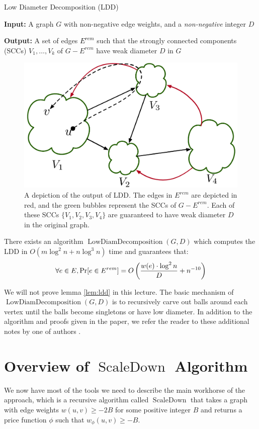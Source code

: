 \documentclass[11pt]{article}
\newcommand{\ScaleDown}{\operatorname{ScaleDown}}
\newcommand{\SCCDecomposition}{\operatorname{LowDiamDecomposition}}
\newcommand{\LowDiamDecomposition}{\SCCDecomposition}
\newcommand{\esep}{E^{rem}}
\newenvironment{tight_itemize}{
\begin{itemize}
 \setlength{\itemsep}{2pt}
 \setlength{\parskip}{1pt}
}{\end{itemize}}
\begin{document}
\begin{definition}{Low Diameter Decomposition (LDD)}
         \begin{tight_itemize}
             \item \textbf{Input:} A graph $G$ with non-negative edge weights, and a \emph{non-negative} integer $D$
             \item \textbf{Output:} A set of edges \textcolor{black}{$\esep$} such that the strongly connected components (SCCs) $V_1, \dots, V_k$ of $G - \esep$ have weak diameter $D$ in $G$
         \end{tight_itemize}
\end{definition}
\begin{figure}[ht]
    \centering
    \includegraphics[width=0.4\linewidth]{images/ldd.pdf}
    \caption{A depiction of the output of LDD. The edges in $\esep$ are depicted in red, and the green bubbles represent the SCCs of $G - \esep$. Each of these SCCs $\{V_1, V_2, V_3, V_4\}$ are guaranteed to have weak diameter $D$ in the original graph.}
    \label{fig:my_label}
\end{figure}

\begin{lemma} \label{lem:ldd}
    There exists an algorithm $\LowDiamDecomposition(G, D)$ which computes the LDD in  $O(m\log^2 n+n\log^3 n)$ time and guarantees that:
    $$\forall e \in E, \Pr[e \in \textcolor{black}{\esep}] = O\left(\frac{w(e) \cdot \log^2 n}{D} + n^{-10}\right)$$
\end{lemma}

 We will not prove lemma \ref{lem:ldd} in this lecture. The basic mechanism of $\LowDiamDecomposition(G, D)$ is to recursively carve out balls around each vertex until the balls become singletons or have low diameter. In addition to the algorithm and proofs given in the paper, we refer the reader to these additional notes by one of authors \cite{LDD}.

\section{Overview of $\ScaleDown$ Algorithm}
We now have most of the tools we need to describe the main workhorse of the approach, which is a recursive algorithm called $\ScaleDown$ that takes
a graph with edge weights $w(u,v) \geq -2B$ for some positive integer $B$ and returns a price function $\phi$ such that $w_\phi(u,v) \geq -B$.
\end{document}
